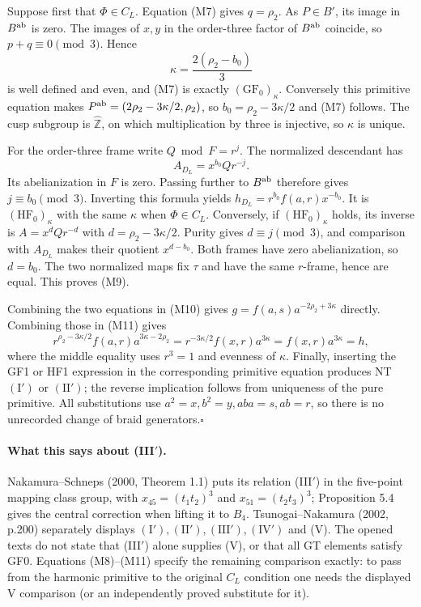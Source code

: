 Suppose first that $\Phi\in C_L$. Equation (M7) gives $q=\rho_2$.
As $P\in B'$, its image in $B^{\rm ab}$ is zero. The images of
$x,y$ in the order-three factor of $B^{\rm ab}$ coincide, so
$p+q\equiv0\pmod3$. Hence
\[
      \kappa=\frac{2(\rho_2-b_0)}3
\]
is well defined and even, and (M7) is exactly
$(\mathrm{GF}_0)_\kappa$. Conversely this primitive equation makes
$P^{\rm ab}=(2\rho_2-3\kappa/2,\rho_2)$, so
$b_0=\rho_2-3\kappa/2$ and (M7) follows. The cusp subgroup is
$\widehat{\mathbb Z}$, on which multiplication by three is injective,
so $\kappa$ is unique.

For the order-three frame write $Q\bmod F=r^j$.
The normalized descendant has
\[
 A_{D_L}=x^{b_0}Qr^{-j}.
\]
Its abelianization in $F$ is zero. Passing further to $B^{\rm ab}$
therefore gives $j\equiv b_0\pmod3$. Inverting this formula yields
$h_{D_L}=r^{b_0}f(a,r)x^{-b_0}$. It is
$(\mathrm{HF}_0)_\kappa$ with the same $\kappa$ when $\Phi\in C_L$.
Conversely, if $(\mathrm{HF}_0)_\kappa$ holds, its inverse is
$A=x^dQr^{-d}$ with $d=\rho_2-3\kappa/2$. Purity gives
$d\equiv j\pmod3$, and comparison with $A_{D_L}$ makes their
quotient $x^{d-b_0}$. Both frames have zero abelianization, so
$d=b_0$. The two normalized maps fix $\tau$ and have the same
$r$-frame, hence are equal. This proves (M9).

Combining the two equations in (M10) gives
$g=f(a,s)a^{-2\rho_2+3\kappa}$ directly. Combining those in (M11)
gives
\[
 r^{\rho_2-3\kappa/2}f(a,r)a^{3\kappa-2\rho_2}
 =r^{-3\kappa/2}f(x,r)a^{3\kappa}
 =f(x,r)a^{3\kappa}=h,
\]
where the middle equality uses $r^3=1$ and evenness of $\kappa$.
Finally, inserting the GF1 or HF1 expression in the corresponding
primitive equation produces NT $(\mathrm I')$ or $(\mathrm{II}')$;
the reverse implication follows from uniqueness of the pure
primitive. All substitutions use $a^2=x,b^2=y,aba=s,ab=r$, so
there is no unrecorded change of braid generators.\hfill$\square$

\paragraph{What this says about (III$'$).}
Nakamura--Schneps (2000, Theorem 1.1) puts its relation (III$'$) in
the five-point mapping class group, with
$x_{45}=(t_1t_2)^3$ and $x_{51}=(t_2t_3)^3$; Proposition 5.4
gives the central correction when lifting it to $B_4$.
Tsunogai--Nakamura (2002, p.200) separately displays
$(\mathrm I'),(\mathrm{II}'),(\mathrm{III}'),(\mathrm{IV}')$ and (V).
The opened texts do not state that (III$'$) alone supplies (V), or
that all GT elements satisfy GF0. Equations (M8)--(M11) specify
the remaining comparison exactly: to pass from the harmonic
primitive to the original $C_L$ condition one needs the displayed
V comparison (or an independently proved substitute for it).
